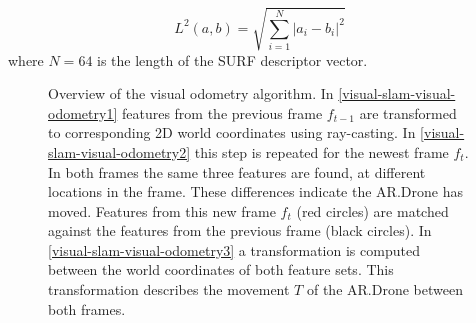 \begin{equation}
L^2(a,b) =\sqrt { \sum_{i=1}^{N} \left| a_i - b_i \right| ^2 }
\end{equation}
where $N = 64$ is the length of the SURF descriptor vector.

\begin{figure}[htb!]
  \begin{center}
 \end{center}
  \caption{Overview of the visual odometry algorithm. In \ref{visual-slam-visual-odometry1} features from the previous frame $f_{t-1}$ are transformed to corresponding 2D world coordinates using ray-casting. In \ref{visual-slam-visual-odometry2} this step is repeated for the newest frame $f_t$. In both frames the same three features are found, at different locations in the frame. These differences indicate the AR.Drone has moved. Features from this new frame $f_t$ (red circles) are matched against the features from the previous frame (black circles). In \ref{visual-slam-visual-odometry3} a transformation is computed between the world coordinates of both feature sets. This transformation describes the movement $T$ of the AR.Drone between both frames.}
  \label{visual-slam-visual-odometry}
\end{figure}


